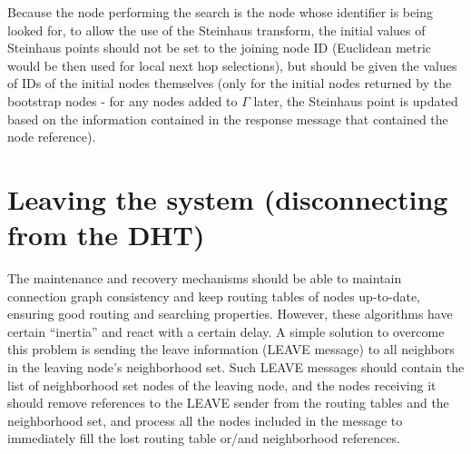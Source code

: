 Because the node performing the search is the node whose identifier is being looked for, to allow the use of the Steinhaus transform, the initial values of Steinhaus points should not be set to the joining node ID (Euclidean metric would be then used for local next hop selections), but should be given the values of IDs of the initial nodes themselves (only for the initial nodes returned by the bootstrap nodes - for any nodes added to $\Gamma$ later, the Steinhaus point is updated based on the information contained in the response message that contained the node reference).










\section{Leaving the system (disconnecting from the DHT)}

The maintenance and recovery mechanisms should be able to maintain connection graph consistency and keep routing tables of nodes up-to-date, ensuring good routing and searching properties. However, these algorithms have certain ``inertia'' and react with a certain delay. A simple solution to overcome this problem is sending the leave information (LEAVE message) to all neighbors in the leaving node's neighborhood set. Such LEAVE messages should contain the list of neighborhood set nodes of the leaving node, and the nodes receiving it should remove references to the LEAVE sender from the routing tables and the neighborhood set, and process all the nodes included in the message to immediately fill the lost routing table or/and neighborhood references.










